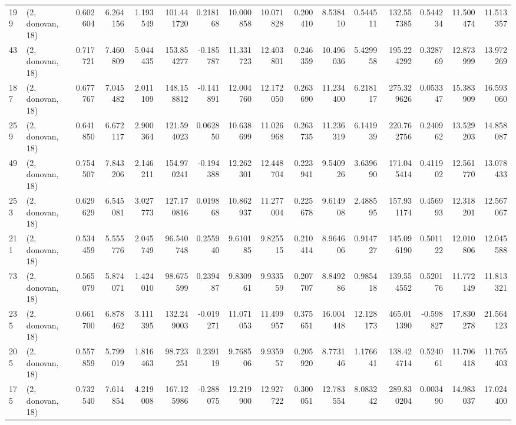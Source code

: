 \begin{tabular}{llrrrrrrrrrrrrrr}
199 &  (2, donovan, 18) &   0.602604 &   6.264156 &   1.193549 &   101.441720 &   0.218168 &  10.000858 &  10.071828 &  0.200410 &   8.538410 &   0.544511 &    132.557385 &    0.544234 &   11.500474 &   11.513357 \\
43  &  (2, donovan, 18) &   0.717721 &   7.460809 &   5.044435 &   153.854277 &  -0.185787 &  11.331723 &  12.403801 &  0.246359 &  10.496036 &   5.429958 &    195.224292 &    0.328769 &   12.873999 &   13.972269 \\
187 &  (2, donovan, 18) &   0.677767 &   7.045482 &   2.011109 &   148.158812 &  -0.141891 &  12.004760 &  12.172050 &  0.263690 &  11.234400 &   6.218117 &    275.329626 &    0.053347 &   15.383909 &   16.593060 \\
259 &  (2, donovan, 18) &   0.641850 &   6.672117 &   2.900364 &   121.594023 &   0.062850 &  10.638699 &  11.026968 &  0.263735 &  11.236319 &   6.141939 &    220.762756 &    0.240962 &   13.529203 &   14.858087 \\
49  &  (2, donovan, 18) &   0.754507 &   7.843206 &   2.146211 &   154.970241 &  -0.194388 &  12.262301 &  12.448704 &  0.223941 &   9.540926 &   3.639690 &    171.045414 &    0.411902 &   12.561770 &   13.078433 \\
253 &  (2, donovan, 18) &   0.629629 &   6.545081 &   3.027773 &   127.170816 &   0.019868 &  10.862937 &  11.277004 &  0.225678 &   9.614908 &   2.488595 &    157.931174 &    0.456993 &   12.318201 &   12.567067 \\
211 &  (2, donovan, 18) &   0.534459 &   5.555776 &   2.045749 &    96.540748 &   0.255940 &   9.610185 &   9.825515 &  0.210414 &   8.964606 &   0.914727 &    145.096190 &    0.501122 &   12.010806 &   12.045588 \\
73  &  (2, donovan, 18) &   0.565079 &   5.874071 &   1.424010 &    98.675599 &   0.239487 &   9.830961 &   9.933559 &  0.207707 &   8.849286 &   0.985418 &    139.554552 &    0.520176 &   11.772149 &   11.813321 \\
235 &  (2, donovan, 18) &   0.661700 &   6.878462 &   3.111395 &   132.249003 &  -0.019271 &  11.071053 &  11.499957 &  0.375651 &  16.004448 &  12.128173 &    465.011390 &   -0.598827 &   17.830278 &   21.564123 \\
205 &  (2, donovan, 18) &   0.557859 &   5.799019 &   1.816463 &    98.723251 &   0.239119 &   9.768506 &   9.935957 &  0.205920 &   8.773146 &   1.176641 &    138.424714 &    0.524061 &   11.706418 &   11.765403 \\
175 &  (2, donovan, 18) &   0.732540 &   7.614854 &   4.219008 &   167.125986 &  -0.288075 &  12.219900 &  12.927722 &  0.300051 &  12.783554 &   8.083242 &    289.830204 &    0.003490 &   14.983037 &   17.024400 \\

\end{tabular}
